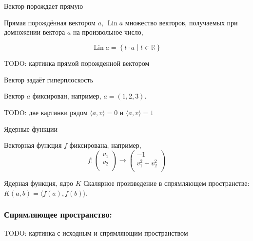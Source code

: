 \documentclass[14pt,xcolor=dvipsnames]{beamer}
\DeclareMathOperator{\Lin}{\mathrm{Lin}}
\newcommand\R{\mathbb{R}}
\begin{document}
\begin{frame}{Вектор порождает прямую}

\begin{block}{Прямая порождённая вектором $a$, $\Lin a$}
множество векторов, получаемых при домножении вектора $a$ на произвольное число,
\end{block}
\[
\Lin a = \left\{t\cdot a \middle| t \in \R \right\}  
\]

\begin{block}{TODO: картинка прямой порожденной вектором}
\end{block}

\end{frame}


\begin{frame}{Вектор задаёт гиперплоскость}

Вектор $a$ фиксирован, например, $a=(1, 2, 3)$.

\begin{block}{TODO: две картинки рядом}
$\langle a, v \rangle = 0$ и $\langle a, v \rangle = 1$   
\end{block}


\end{frame}


\begin{frame}{Ядерные функции}

Векторная функция $f$ фиксирована, например, 
\[
  f : \begin{pmatrix}
    v_1 \\
    v_2 \\
  \end{pmatrix} \to 
  \begin{pmatrix}
    -1 \\
    v_1^2 + v_2^2 \\
  \end{pmatrix}
\]

\begin{block}{Ядерная функция, ядро $K$}
Скалярное произведение в спрямляющем пространстве:
$K(a, b) = \langle f(a), f(b) \rangle$.
\end{block}
\end{frame}

\begin{frame}
  \frametitle{Спрямляющее пространство:}

\begin{block}{TODO: картинка с исходным и спрямляющим пространством} 
  
\end{block}
  

\end{frame}
\end{document}
